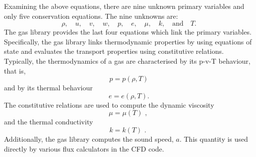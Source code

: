 Examining the above equations, there are nine unknown primary variables and only 
five conservation equations.
The nine unknowns are:
\[ \rho,\quad  u,\quad  v,\quad w,\quad p,\quad e,\quad \mu,\quad k,\quad \text{and}\quad T. \]
The gas library provides the last four equations which link the primary
variables.
Specifically, the gas library links thermodynamic properties
by using equations of state and evaluates the transport properties
using constitutive relations.
Typically, the thermodynamics of a gas are characterised by its
p-v-T behaviour, that is,
\begin{equation}
   p = p(\rho, T)
\end{equation}
and by its thermal behaviour
\begin{equation}
   e = e(\rho, T) \text{.}
\end{equation}
The constitutive relations are used to compute the dynamic viscosity
\begin{equation}
 \mu = \mu(T) \text{ , }
\end{equation}
and the thermal conductivity
\begin{equation}
 k = k(T) \text{ . }
\end{equation}
Additionally, the gas library computes the sound speed, $a$.
This quantity is used directly by various flux calculators in
the CFD code.


